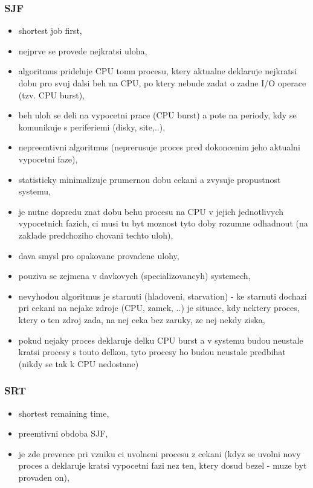 \documentclass[a4paper, 11pt]{article}
\begin{document}
\subsubsection{SJF}
\begin{itemize}
    \item shortest job first,
    \item nejprve se provede nejkratsi uloha,
    \item algoritmus prideluje CPU tomu procesu, ktery aktualne deklaruje nejkratsi dobu pro svuj dalsi beh na CPU, po ktery nebude zadat o zadne I/O operace (tzv. CPU burst),
    \item beh uloh se deli na vypocetni prace (CPU burst) a pote na periody, kdy se komunikuje s periferiemi (disky, site,..),
    \item nepreemtivni algoritmus (neprerusuje proces pred dokoncenim jeho aktualni vypocetni faze),
    \item statisticky minimalizuje prumernou dobu cekani a zvysuje propustnost systemu,
    \item je nutne dopredu znat dobu behu procesu na CPU v jejich jednotlivych vypocetnich fazich, ci musi tu byt moznost tyto doby rozumne odhadnout (na zaklade predchoziho chovani techto uloh),
    \item dava smysl pro opakovane provadene ulohy, 
    \item pouziva se zejmena v davkovych (specializovancyh) systemech,
    \item nevyhodou algoritmus je starnuti (hladoveni, starvation) - ke starnuti dochazi pri cekani na nejake zdroje (CPU, zamek, ..) je situace, kdy nektery proces, ktery o ten zdroj zada, na nej ceka bez zaruky, ze nej nekdy ziska,
    \item pokud nejaky proces deklaruje delku CPU burst a v systemu budou neustale kratsi procesy s touto delkou, tyto procesy ho budou neustale predbihat (nikdy se tak k CPU nedostane) \\
\end{itemize}

\subsubsection{SRT}
\begin{itemize}
    \item shortest remaining time,
    \item preemtivni obdoba SJF,
    \item je zde prevence pri vzniku ci uvolneni procesu z cekani (kdyz se uvolni novy proces a deklaruje kratsi vypocetni fazi nez ten, ktery dosud bezel - muze byt provaden on), \\
\end{itemize}
\end{document}
